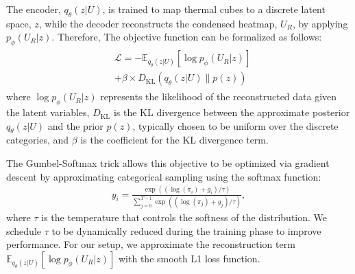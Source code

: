 The encoder, \({q}_{\theta}(z|U)\), is trained to map thermal cubes to a discrete latent space, $z$, while the decoder reconstructs the condensed heatmap, $U_{R}$, by applying \({p}_{\phi}(U_{R}|z)\). Therefore, The objective function can be formalized as follows:
\begin{align}
\label{eq:dv_loss}
\begin{split}
& \mathcal{L} = -\mathbb{E}_{{q}_{\theta}(z|U)}[\log {p}_{\phi}(U_{R}|z)] \\
& + \beta \times D_{\mathrm{KL}}({q}_{\theta}(z|U) \parallel p(z))
\end{split}
\end{align}
where \( \log {p}_{\phi}(U_{R}|z) \) represents the likelihood of the reconstructed data given the latent variables, \( D_{\mathrm{KL}} \) is the KL divergence between the approximate posterior \( {q}_{\theta}(z|U) \) and the prior \( p(z) \), typically chosen to be uniform over the discrete categories, and $\beta$ is the coefficient for the KL divergence term. 

% 
% 

The Gumbel-Softmax trick allows this objective to be optimized via gradient descent by approximating categorical sampling using the softmax function:
\begin{align}
y_i = \frac{\exp((\log(\pi_i) + g_i) / \tau)}{\sum_{j=0}^{T-1} \exp((\log(\pi_j) + g_j) / \tau)},
\end{align}
where \( \tau \) is the temperature that controls the softness of the distribution. We schedule \(\tau\) to be dynamically reduced during the training phase to improve performance. For our setup, we approximate the reconstruction term \(\mathbb{E}_{{q}_{\theta}(z|U)}[\log {p}_{\phi}(U_{R}|z)]\) with the smooth L1 loss function.

